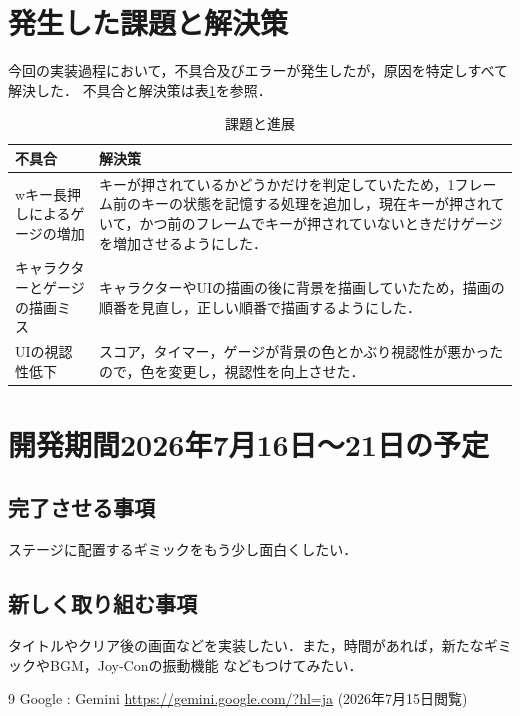 \documentclass{jsarticle}
\begin{document}
\section{発生した課題と解決策}
今回の実装過程において，不具合及びエラーが発生したが，原因を特定しすべて解決した．
不具合と解決策は表\ref{table2}を参照．
\begin{table}[htb]
\begin{center}
\caption{課題と進展}
\label{table2}
\begin{tabular}{|p{7cm}|p{7cm}|}\hline
不具合 & 解決策 \\ \hline \hline
wキー長押しによるゲージの増加 & キーが押されているかどうかだけを判定していたため，1フレーム前のキーの状態を記憶する処理を追加し，現在キーが押されていて，かつ前のフレームでキーが押されていないときだけゲージを増加させるようにした． \\ \hline
キャラクターとゲージの描画ミス & キャラクターやUIの描画の後に背景を描画していたため，描画の順番を見直し，正しい順番で描画するようにした． \\ \hline
UIの視認性低下 & スコア，タイマー，ゲージが背景の色とかぶり視認性が悪かったので，色を変更し，視認性を向上させた． \\ \hline
\end{tabular}
\end{center}
\end{table}


\section{開発期間2026年7月16日～21日の予定}

\subsection{完了させる事項}
ステージに配置するギミックをもう少し面白くしたい．

\subsection{新しく取り組む事項}
タイトルやクリア後の画面などを実装したい．また，時間があれば，新たなギミックやBGM，Joy-Conの振動機能
などもつけてみたい．


\begin{thebibliography}{9}
 Google : Gemini \url{https://gemini.google.com/?hl=ja} (2026年7月15日閲覧)
\end{thebibliography}
\end{document}
